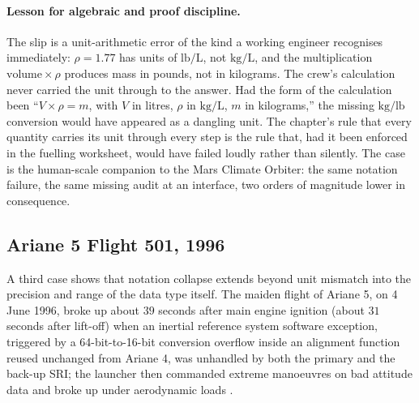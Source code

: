 \paragraph{Lesson for algebraic and proof discipline.}
The slip is a unit-arithmetic error of the kind a working engineer
recognises immediately: $\rho = 1.77$ has units of $\text{lb}/\si{
\liter}$, not $\si{\kilogram\per\liter}$, and the multiplication
$\text{volume} \times \rho$ produces mass in pounds, not in
kilograms. The crew's calculation never carried the unit through to
the answer. Had the form of the calculation been ``$V \times \rho =
m$, with $V$ in litres, $\rho$ in $\si{\kilogram\per\liter}$, $m$ in
kilograms,'' the missing $\si{\kilogram}/\text{lb}$ conversion would
have appeared as a dangling unit. The chapter's rule that every
quantity carries its unit through every step is the rule that, had
it been enforced in the fuelling worksheet, would have failed loudly
rather than silently. The case is the human-scale companion to the
Mars Climate Orbiter: the same notation failure, the same missing
audit at an interface, two orders of magnitude lower in
consequence.

\subsection{Ariane 5 Flight 501, 1996}

A third case shows that notation collapse extends beyond unit
mismatch into the precision and range of the data type itself. The
maiden flight of Ariane 5, on 4 June 1996, broke up about $39$
seconds after main engine ignition (about $31$ seconds after
lift-off) when an inertial reference system software exception,
triggered by a 64-bit-to-16-bit conversion overflow inside an
alignment function reused unchanged from Ariane 4, was unhandled by
both the primary and the back-up SRI; the launcher then commanded
extreme manoeuvres on bad attitude data and broke up under
aerodynamic loads \cite{acc:ariane501-ifr}.

